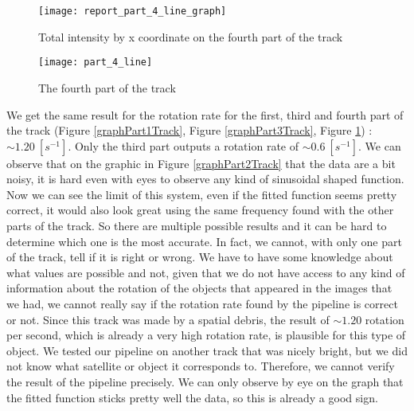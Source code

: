 \documentclass[a4paper,12pt,oneside]{report}
\begin{document}
\begin{figure}[h]
    \begin{minipage}[c]{.47\linewidth}
        \centering
        \texttt{[image: report\_part\_4\_line\_graph]}
        \caption{Total intensity by x coordinate on the fourth part of the track}
        \label{graphPart4Track}
    \end{minipage}
    \hfill
    \begin{minipage}[c]{.47\linewidth}
        \centering
        \texttt{[image: part\_4\_line]}
        \caption{The fourth part of the track}
    \end{minipage}
\end{figure}
\newline
\newline
\newline
\newline
\newline
We get the same result for the rotation rate for the first, third and fourth part of the track (Figure \ref{graphPart1Track}, 
Figure \ref{graphPart3Track}, Figure \ref{graphPart4Track}) : $\sim 1.20\ [s^{-1}]$. Only the third part outputs a rotation rate 
of $\sim 0.6\ [s^{-1}]$. We can observe that on the graphic in Figure \ref{graphPart2Track} that the data are a bit noisy, it is hard
even with eyes to observe any kind of sinusoidal shaped function. Now we can see the limit of this system, even if the fitted function 
seems pretty correct, it would also look great using the same frequency found with the other parts of the track. So there are multiple
possible results and it can be hard to determine which one is the most accurate. In fact, we cannot, with only one part of the track,
tell if it is right or wrong. We have to have some knowledge about what values are possible and not, given that we do not have access 
to any kind of information about the rotation of the objects that appeared in the images that we had, we cannot really say if the rotation
rate found by the pipeline is correct or not. 
\newline
\newline
Since this track was made by a spatial debris, the result of $\sim 1.20$ rotation per second, which is already a very high rotation rate, 
is plausible for this type of object. 
\newline
\newline
We tested our pipeline on another track that was nicely bright, but we did not know what satellite or object it corresponds to. Therefore,
we cannot verify the result of the pipeline precisely. We can only observe by eye on the graph that the fitted function sticks pretty
well the data, so this is already a good sign.
\end{document}
